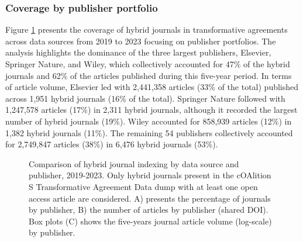 \documentclass[a4paper,man,floatsintext,longtable,noextraspace,10pt]{apa6}
\begin{document}
\subsubsection{Coverage by publisher
portfolio}\label{coverage-by-publisher-portfolio}

Figure \ref{fig-upset_coverage_results_publisher} presents the coverage
of hybrid journals in transformative agreements across data sources from
2019 to 2023 focusing on publisher portfolios. The analysis highlights
the dominance of the three largest publishers, Elsevier, Springer
Nature, and Wiley, which collectively accounted for 47\% of the hybrid
journals and 62\% of the articles published during this five-year
period. In terms of article volume, Elsevier led with 2,441,358 articles
(33\% of the total) published across 1,951 hybrid journals (16\% of the
total). Springer Nature followed with 1,247,578 articles (17\%) in 2,311
hybrid journals, although it recorded the largest number of hybrid
journals (19\%). Wiley accounted for 858,939 articles (12\%) in 1,382
hybrid journals (11\%). The remaining 54 publishers collectively
accounted for 2,749,847 articles (38\%) in 6,476 hybrid journals (53\%).

\begin{figure}[ht!]


\caption{\label{fig-upset_coverage_results_publisher}Comparison of
hybrid journal indexing by data source and publisher, 2019-2023. Only
hybrid journals present in the cOAlition S Transformative Agreement Data
dump with at least one open access article are considered. A) presents
the percentage of journals by publisher, B) the number of articles by
publisher (shared DOI). Box plots (C) shows the five-years journal
article volume (log-scale) by publisher.}

\end{figure}%
\end{document}
